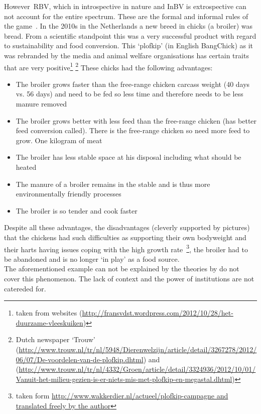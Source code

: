 However~\gls{RBV}, which in introspective in nature and \gls{InBV} is extrospective can not account for the entire spectrum. These are the formal and informal rules of the game~\cite{North:1990}. In the 2010s in the Netherlands a new breed in chicks (a broiler) was bread. From a scientific standpoint this was a very successful product with regard to sustainability and food conversion. 
This `plofkip' (in English BangChick) as it was rebranded by the media and animal welfare organisations has certain traits that are very positive\footnote{taken from websites (\url{http://fransvdst.wordpress.com/2012/10/28/het-duurzame-vleeskuiken})} \footnote{Dutch newspaper `Trouw'
(\url{http://www.trouw.nl/tr/nl/5948/Dierenwelzijn/article/detail/3267278/2012/06/07/De-voordelen-van-de-plofkip.dhtml}) 
and (\url{http://www.trouw.nl/tr/nl/4332/Groen/article/detail/3324936/2012/10/01/Vanuit-het-milieu-gezien-is-er-niets-mis-met-plofkip-en-megastal.dhtml})}
\newpage
These chicks had the following advantages:


\begin{itemize}
\item The broiler grows faster than the free-range chicken carcass weight (40 days vs. 56 days) and need to be fed so less time and therefore needs to be less manure removed
 \item    The broiler grows better with less feed than the free-range chicken (has better feed conversion called). There is the free-range chicken so need more feed to grow. One kilogram of meat
\item     The broiler has less stable space at his disposal including what should be heated
\item     The manure of a broiler remains in the stable and is thus more environmentally friendly processes
  \item   The broiler is so tender and cook faster
\end{itemize}
Despite all these advantages, the disadvantages (cleverly supported by pictures) that the chickens had such difficulties as supporting their own bodyweight and their harts having issues coping with the high growth rate~\footnote{taken form \url{http://www.wakkerdier.nl/actueel/plofkip-campagne and translated freely by the author}}, the broiler had to be abandoned and is no longer `in play' as a food source.\\
The aforementioned example can not be explained by the theories by \cite{Porter:1980,Barney:1991} do not cover this phenomenon. The lack of context and the power of institutions are not catereded for.  

